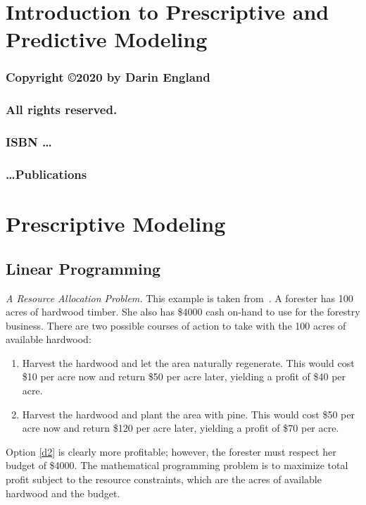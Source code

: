 \documentclass[12pt]{book}
\begin{document}
\frontmatter
%
\chapter*{\Huge \center Introduction to Prescriptive and Predictive Modeling }
\thispagestyle{empty}
\newpage
\subsection*{\center \normalsize Copyright \copyright 2020 by Darin England}
\subsection*{\center \normalsize All rights reserved.}
\subsection*{\center \normalsize ISBN \dots}
\subsection*{\center \normalsize \dots Publications}
%
%
\tableofcontents
%
\mainmatter
%
\chapter{Prescriptive Modeling}
\section{Linear Programming}

\emph{A Resource Allocation Problem.} This example is taken 
from~\cite{chvatal:1983}.  A forester has 100
acres of hardwood timber. She also has \$4000 cash on-hand to use for
the forestry business. There are two possible courses of action to
take with the 100 acres of available hardwood:
\begin{enumerate}
\item Harvest the hardwood and let the area naturally regenerate. This
  would cost \$10 per acre now and return \$50 per acre later,
  yielding a profit of \$40 per acre.
\item Harvest the hardwood and plant the area with pine. This would
  cost \$50 per acre now and return \$120 per acre later, yielding a
  profit of \$70 per acre. \label{d2}
\end{enumerate}
Option \ref{d2} is clearly more profitable; however, the forester must
respect her budget of \$4000. The mathematical programming problem is
to maximize total profit subject to the resource constraints, which
are the acres of available hardwood and the budget.
\end{document}
